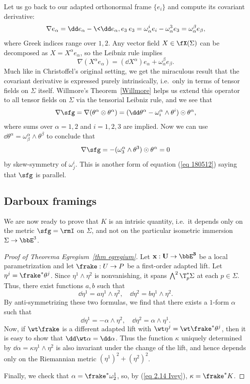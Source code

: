 \begin{rem}
    Let us go back to our adapted orthonormal frame $\{e_i\}$ and compute its covariant derivative:
    \[\nabla e_\alpha=\dd e_\alpha-\<\dd e_\alpha,e_3\>e_3=\omega^i_\alpha e_i-\omega^3_\alpha e_3=\omega^\beta_\alpha e_\beta,\]
    where Greek indices range over $1,2$. Any vector field $X\in\fX(\Sigma)$ can be decomposed as $X=X^\alpha e_\alpha$, so the Leibniz rule implies 
    \[\nabla(X^\alpha e_\alpha)=(\dd X^\alpha)e_\alpha+\omega^\beta_\alpha e_\beta.\]
    Much like in Christoffel's original setting, we get the miraculous result that the covariant derivative is expressed purely intrinsically, i.e.\ only in terms of tensor fields on $\Sigma$ itself.
    Willmore's Theorem~\ref{Willmore} helps us extend this operator to all tensor fields on $\Sigma$ via the tensorial Leibniz rule, and we see that
    \[\nabla\sfg=\nabla(\theta^\alpha\otimes \theta^\alpha)=(\dd \theta^\alpha-\omega^\alpha_i\wedge \theta^i)\odot \theta^\alpha,\]
    where sums over $\alpha=1,2$ and $i=1,2,3$ are implied. Now we can use $\dd\theta^\alpha=\omega^\alpha_\beta\wedge\theta^\beta$ to conclude that 
    \[\nabla\sfg=-(\omega^\alpha_3\wedge\theta^3)\odot \theta^\alpha=0\]
    by skew-symmetry of $\omega^i_j$. This is another form of equation (\ref{eq 180512}) saying that $\sfg$ is parallel.
\end{rem}








\subsection{Darboux framings}\label{sec: principal framings}

We are now ready to prove that $K$ is an intrisic quantity, i.e.\ it depends only on the metric $\sfg=\rmI$ on $\Sigma$, and not on the particular isometric immersion $\Sigma\to \bbE^3$.

\begin{proof}[Proof of Theorema Egregium~\ref{thm egregium}]
    Let $\bf{x}:U\to \bbE^3$ be a local parametrization and let $\frake:U\to P$ be a first-order adapted lift. Let $\eta^j=\frake^\ast\theta^j$. Since $\eta^1\wedge\eta^2$ is nonvanishing, it spans $\bigwedge^2 \T_p^\ast\Sigma$ at each $p\in\Sigma$. Thus, there exist functions $a,b$ such that 
    \[\dd\eta^1=a\eta^1\wedge\eta^2,\quad \dd\eta^2=b\eta^1\wedge \eta^2.\]
    By anti-symmetrizing these two formulas, we find that there exists a $1$-form $\alpha$ such that 
    \[\dd\eta^1=-\alpha\wedge\eta^2,\quad \dd\eta^2=\alpha\wedge\eta^1.\]
    Now, if $\wt\frake$ is a different adapted lift with $\wt\eta^j=\wt\frake^\ast\theta^j$, then it is easy to show that $\dd\wt\alpha=\dd\alpha$. Thus the function $\kappa$ uniquely determined by $\dd\alpha=\kappa\eta^1\wedge\eta^2$ is also invariant under the change of the lift, and hence depends only on the Riemannian metric $(\eta^1)^2+(\eta^2)^2$.

    Finally, we check that $\alpha=\frake^\ast\omega_2^1$, so, by (\ref{eq 2.14 Ivey}), $\kappa=\frake^\ast K$.
\end{proof}

